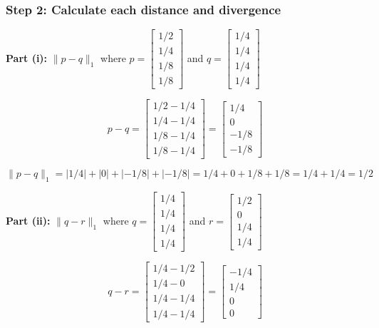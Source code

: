 \documentclass{article}
\begin{document}
\subsubsection*{Step 2: Calculate each distance and divergence}
\parbox{\textwidth}{
\textbf{Part (i):} $\|p - q\|_1$ where $p = \begin{bmatrix} 1/2 \\ 1/4 \\ 1/8 \\ 1/8 \end{bmatrix}$ and $q = \begin{bmatrix} 1/4 \\ 1/4 \\ 1/4 \\ 1/4 \end{bmatrix}$

$$p - q = \begin{bmatrix} 1/2 - 1/4 \\ 1/4 - 1/4 \\ 1/8 - 1/4 \\ 1/8 - 1/4 \end{bmatrix} = \begin{bmatrix} 1/4 \\ 0 \\ -1/8 \\ -1/8 \end{bmatrix}$$

$$\|p - q\|_1 = |1/4| + |0| + |-1/8| + |-1/8| = 1/4 + 0 + 1/8 + 1/8 = 1/4 + 1/4 = 1/2$$

\textbf{Part (ii):} $\|q - r\|_1$ where $q = \begin{bmatrix} 1/4 \\ 1/4 \\ 1/4 \\ 1/4 \end{bmatrix}$ and $r = \begin{bmatrix} 1/2 \\ 0 \\ 1/4 \\ 1/4 \end{bmatrix}$

$$q - r = \begin{bmatrix} 1/4 - 1/2 \\ 1/4 - 0 \\ 1/4 - 1/4 \\ 1/4 - 1/4 \end{bmatrix} = \begin{bmatrix} -1/4 \\ 1/4 \\ 0 \\ 0 \end{bmatrix}$$

}
\end{document}
